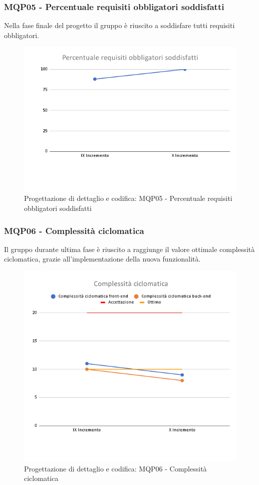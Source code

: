 \subsubsection{MQP05 - Percentuale requisiti obbligatori soddisfatti}
Nella fase finale del progetto il gruppo è riuscito a soddisfare tutti requisiti obbligatori.
\begin{figure}[H]
    \centering
    \includegraphics[scale=0.50]{Sezioni/images/last_prodotto/Percentuale_requisiti_obbligatori_soddisfatti.png}
    \caption{Progettazione di dettaglio e codifica: MQP05 - Percentuale requisiti obbligatori soddisfatti}
\end{figure}
\subsubsection{MQP06 - Complessità ciclomatica}
Il gruppo durante ultima fase è riuscito a raggiunge il valore ottimale complessità ciclomatica, grazie all'implementazione della nuova funzionalità.
\begin{figure}[H]
    \centering
    \includegraphics[scale=0.50]{Sezioni/images/last_prodotto/Complessita_ciclomatica.png}
    \caption{Progettazione di dettaglio e codifica: MQP06 - Complessità ciclomatica}
\end{figure}

